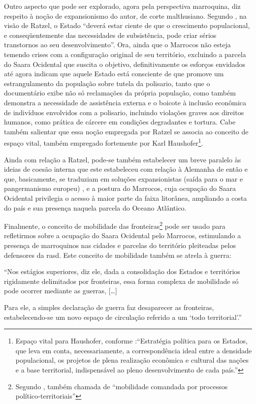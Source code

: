	Outro aspecto que pode ser explorado, agora pela perspectiva marroquina, diz respeito à noção de expansionismo do autor, de corte malthusiano. Segundo , na visão de Ratzel, o Estado ``deverá estar ciente de que o crescimento populacional, e conseqüentemente das necessidades de subsistência, pode criar sérios transtornos ao seu desenvolvimento''. Ora, ainda que o Marrocos não esteja temendo crises com a configuração original de seu território, excluindo a parcela do Saara Ocidental que suscita o objetivo, definitivamente os esforços envidados até agora indicam que aquele Estado está consciente de que promove um estrangulamento da população sobre tutela da \gls{polisario}, tanto que o documentário exibe não só reclamações da própria população, como também demonstra a necessidade de assistência externa e o boicote à inclusão econômica de indivíduos envolvidos com a \gls{polisario}, incluindo violações graves aos direitos humanos, como prática de cárcere em condições degradantes e tortura. Cabe também salientar que essa noção empregada por Ratzel se associa ao conceito de espaço vital, também empregado fortemente por Karl Haushofer\footnote{Espaço vital para Haushofer, conforme :``Estratégia política para	os Estados, que leva em conta, necessariamente, a correspondência ideal entre a densidade populacional, os projetos de plena realização econômica e cultural das nações e a base territorial, indispensável ao pleno desenvolvimento de cada país.''}.
	
	Ainda com relação a Ratzel, pode-se também estabelecer um breve paralelo às ideias de coesão interna que este estabeleceu com relação à Alemanha de então e que, basicamente, se traduziam em soluções expansionistas (saída para o mar e pangermanismo europeu) \cite[p. 41]{costa1992}, e a postura do Marrocos, cuja ocupação do Saara Ocidental privilegia o acesso à maior parte da faixa litorânea, ampliando a costa do país e sua presença naquela parcela do Oceano Atlântico.
	
	Finalmente, o conceito de mobilidade das fronteiras\footnote{Segundo , também chamada de ``mobilidade comandada por processos político-territoriais''} pode ser usado para refletirmos sobre a ocupação do Saara Ocidental pelo Marrocos, estimulando a presença de marroquinos nas cidades e parcelas do território pleiteadas pelos defensores da \glsdesc{rasd}. Este conceito de mobilidade também se atrela à guerra:
	
	\begin{citacao}
		``Nos estágios superiores, diz ele, dada a consolidação dos Estados e territórios rigidamente delimitados por fronteiras, essa forma complexa	de mobilidade só pode ocorrer mediante as guerras, [\dots]
		
		Para ele, a simples declaração de guerra faz desaparecer as fronteiras, estabelecendo-se um novo espaço de circulação referido a um `todo territorial'.''
	\end{citacao}
	
